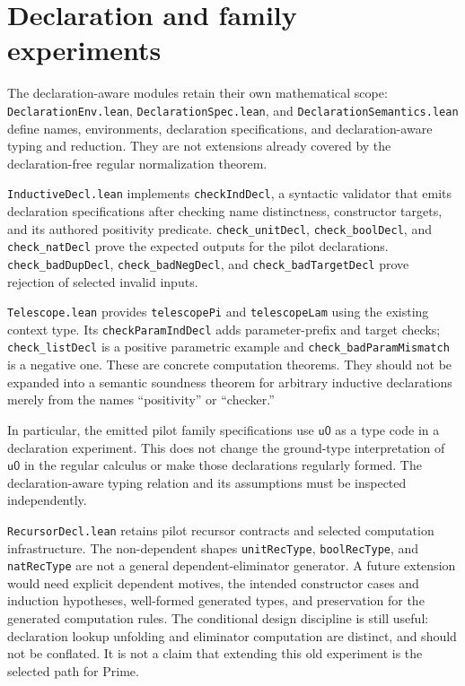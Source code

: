 \documentclass[11pt]{article}
\newcommand{\code}[1]{\nolinkurl{#1}}
\newcommand{\uZ}{\mathsf{u0}}
\begin{document}
\section{Declaration and family experiments}

The declaration-aware modules retain their own mathematical scope:
\code{DeclarationEnv.lean}, \code{DeclarationSpec.lean}, and
\code{DeclarationSemantics.lean} define names, environments, declaration
specifications, and declaration-aware typing and reduction.
They are not extensions already covered by the declaration-free regular
normalization theorem.

\code{InductiveDecl.lean} implements \code{checkIndDecl}, a syntactic
validator that emits declaration specifications after checking name
distinctness, constructor targets, and its authored positivity predicate.
\code{check_unitDecl}, \code{check_boolDecl}, and \code{check_natDecl}
prove the expected outputs for the pilot declarations.
\code{check_badDupDecl}, \code{check_badNegDecl}, and
\code{check_badTargetDecl} prove rejection of selected invalid inputs.

\code{Telescope.lean} provides \code{telescopePi} and
\code{telescopeLam} using the existing context type.
Its \code{checkParamIndDecl} adds parameter-prefix and target checks;
\code{check_listDecl} is a positive parametric example and
\code{check_badParamMismatch} is a negative one.
These are concrete computation theorems. They should not be expanded into a
semantic soundness theorem for arbitrary inductive declarations merely from
the names “positivity” or “checker.”

In particular, the emitted pilot family specifications use $\uZ$ as a type
code in a declaration experiment. This does not change the ground-type
interpretation of $\uZ$ in the regular calculus or make those declarations
regularly formed. The declaration-aware typing relation and its assumptions
must be inspected independently.

\code{RecursorDecl.lean} retains pilot recursor contracts and selected
computation infrastructure.
The non-dependent shapes \code{unitRecType}, \code{boolRecType}, and
\code{natRecType} are not a general dependent-eliminator generator.
A future extension would need explicit dependent motives, the intended
constructor cases and induction hypotheses, well-formed generated types,
and preservation for the generated computation rules.
The conditional design discipline is still useful: declaration lookup
unfolding and eliminator computation are distinct, and should not be
conflated. It is not a claim that extending this old experiment is the
selected path for Prime.
\end{document}
